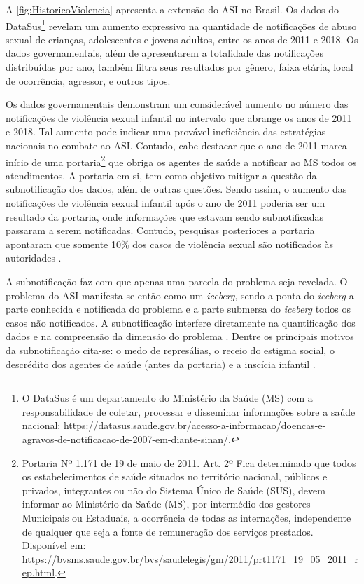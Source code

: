 A \autoref{fig:HistoricoViolencia} apresenta a extensão do \ac{ASI} no Brasil. Os dados do DataSus\footnote{O DataSus é um departamento do Ministério da Saúde (MS) com a responsabilidade de coletar, processar e disseminar informações sobre a saúde nacional: \url{https://datasus.saude.gov.br/acesso-a-informacao/doencas-e-agravos-de-notificacao-de-2007-em-diante-sinan/}.} revelam um aumento expressivo na quantidade de notificações de abuso sexual de crianças, adolescentes e jovens adultos, entre os anos de 2011 e 2018. Os dados governamentais, além de apresentarem a totalidade das notificações distribuídas por ano, também filtra seus resultados por gênero, faixa etária, local de ocorrência, agressor, e outros tipos. 

Os dados governamentais demonstram um considerável aumento no número das notificações de violência sexual infantil no intervalo que abrange os anos de 2011 e 2018. Tal aumento pode indicar uma provável ineficiência das estratégias nacionais no combate ao \ac{ASI}. Contudo, cabe destacar que o ano de 2011 marca início de uma portaria\footnote{\label{note:nota0}Portaria Nº 1.171 de 19 de maio de 2011. Art. 2º Fica determinado que todos os estabelecimentos de saúde situados no território nacional, públicos e privados, integrantes ou não do Sistema Único de Saúde (SUS), devem informar ao Ministério da Saúde (MS), por intermédio dos gestores Municipais ou Estaduais, a ocorrência de todas as internações, independente de qualquer que seja a fonte de remuneração dos serviços prestados. Disponível em: \url{https://bvsms.saude.gov.br/bvs/saudelegis/gm/2011/prt1171_19_05_2011_rep.html}.} que obriga os agentes de saúde a notificar ao \ac{MS} todos os atendimentos. A portaria em si, tem como objetivo mitigar a questão da subnotificação dos dados, além de outras questões. Sendo assim, o aumento das notificações de violência sexual infantil após o ano de 2011 poderia ser um resultado da portaria, onde informações que estavam sendo subnotificadas passaram a serem notificadas. Contudo, pesquisas posteriores a portaria apontaram que somente 10\% dos casos de violência sexual são notificados às autoridades \cite{brasil2020abuso}. 

A subnotificação faz com que apenas uma parcela do problema seja revelada. O problema do \ac{ASI} manifesta-se então como um \textit{iceberg}, sendo a ponta do \textit{iceberg} a parte conhecida e notificada do problema e a parte submersa do \textit{iceberg} todos os casos não notificados. A subnotificação interfere diretamente na quantificação dos dados e na compreensão da dimensão do problema \cite{deslandes2016atendimento, hora2017violencia}. Dentre os principais motivos da subnotificação cita-se: o medo de represálias, o receio do estigma social, o descrédito dos agentes de saúde (antes da portaria) e a inscícia infantil \cite{fbsp2019anuario, pavao2013impasse}. %

